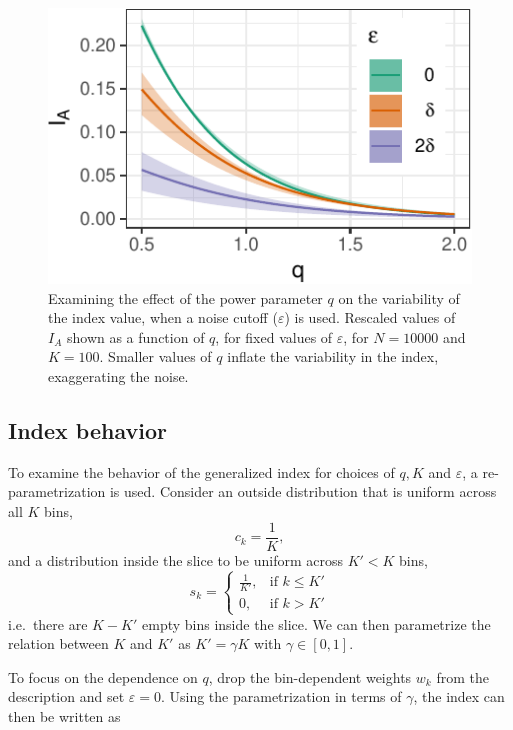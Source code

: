 \documentclass[]{interact}
\theoremstyle{plain}%
\theoremstyle{definition}
\theoremstyle{remark}
\begin{document}
\begin{figure}

{\centering \includegraphics[width=0.5\linewidth]{section_pursuit_files/figure-latex/noise-1} 

}

\caption{Examining the  effect of the power parameter $q$ on the variability of the  index value, when a noise cutoff ($\varepsilon$) is used. Rescaled values of $I_A$ shown as a function of $q$, for fixed values of $\varepsilon$, for $N=10000$ and $K=100$. Smaller values of  $q$ inflate the variability in the index, exaggerating  the noise.}\label{fig:noise}
\end{figure}

\hypertarget{index-behavior}{%
\subsection{\texorpdfstring{Index behavior
\label{sec:behaviour}}{Index behavior }}\label{index-behavior}}

To examine the behavior of the generalized index for choices of \(q, K\)
and \(\varepsilon\), a re-parametrization is used. Consider an outside
distribution that is uniform across all \(K\) bins, \begin{equation}
c_{k} = \frac{1}{K},
\end{equation} and a distribution inside the slice to be uniform across
\(K' < K\) bins, \begin{equation}
s_{k} = \begin{cases}
    \frac{1}{K'}, & \text{if $k \leq K'$}\\
    0, & \text{if $k > K'$}
  \end{cases}
\end{equation} i.e.~there are \(K-K'\) empty bins inside the slice. We
can then parametrize the relation between \(K\) and \(K'\) as
\(K' = \gamma K\) with \(\gamma \in [0,1]\).

To focus on the dependence on \(q\), drop the bin-dependent weights
\(w_k\) from the description and set \(\varepsilon=0\). Using the
parametrization in terms of \(\gamma\), the index can then be written as
\end{document}
